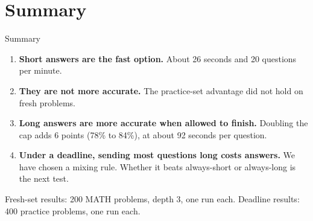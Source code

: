 \documentclass[aspectratio=169,11pt]{beamer}
\newcommand{\src}[1]{\par\vfill\begin{minipage}{0.96\textwidth}\color{muted}\tiny #1\end{minipage}\vspace{-0.15em}}
\begin{document}
\section{Summary}

\begin{frame}{Summary}
  \vspace{0.3em}
  \begin{enumerate}\setlength\itemsep{0.55em}
    \item \textbf{Short answers are the fast option.} About 26 seconds and 20 questions per minute.
    \item \textbf{They are not more accurate.} The practice-set advantage did not hold on fresh problems.
    \item \textbf{Long answers are more accurate when allowed to finish.} Doubling the cap adds 6 points (78\% to 84\%), at about 92 seconds per question.
    \item \textbf{Under a deadline, sending most questions long costs answers.} We have chosen a mixing rule. Whether it beats always-short or always-long is the next test.
  \end{enumerate}
  \src{Fresh-set results: 200 MATH problems, depth 3, one run each. Deadline results: 400 practice problems, one run each.}
\end{frame}
\end{document}
